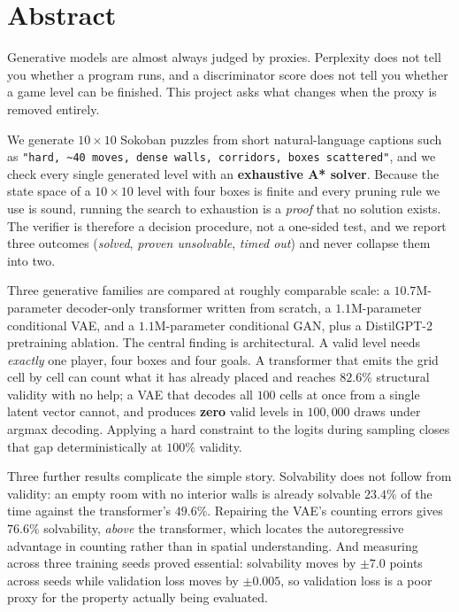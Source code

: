 \documentclass[11pt,a4paper]{report}
\begin{document}
\setcounter{page}{2}

\chapter*{Abstract}

Generative models are almost always judged by proxies. Perplexity does not tell
you whether a program runs, and a discriminator score does not tell you whether
a game level can be finished. This project asks what changes when the proxy is
removed entirely.

We generate $10\times10$ Sokoban puzzles from short natural-language captions
such as \texttt{"hard, \textasciitilde 40 moves, dense walls, corridors, boxes
scattered"}, and we check every single generated level with an
\textbf{exhaustive A* solver}. Because the state space of a $10\times10$ level
with four boxes is finite and every pruning rule we use is sound, running the
search to exhaustion is a \emph{proof} that no solution exists. The verifier is
therefore a decision procedure, not a one-sided test, and we report three
outcomes (\emph{solved}, \emph{proven unsolvable}, \emph{timed out}) and
never collapse them into two.

Three generative families are compared at roughly comparable scale: a
$10.7$M-parameter decoder-only transformer written from scratch, a
$1.1$M-parameter conditional VAE, and a $1.1$M-parameter conditional GAN, plus
a DistilGPT-2 pretraining ablation. The central finding is architectural. A
valid level needs \emph{exactly} one player, four boxes and four goals. A
transformer that emits the grid cell by cell can count what it has already
placed and reaches $82.6\%$ structural validity with no help; a VAE that
decodes all $100$ cells at once from a single latent vector cannot, and produces
\textbf{zero} valid levels in $100{,}000$ draws under argmax decoding. Applying
a hard constraint to the logits during sampling closes that gap deterministically
at $100\%$ validity.

Three further results complicate the simple story. Solvability does not follow
from validity: an empty room with no interior walls is already solvable
$23.4\%$ of the time against the transformer's $49.6\%$. Repairing the VAE's
counting errors gives $76.6\%$ solvability, \emph{above} the transformer,
which locates the autoregressive advantage in counting rather than in spatial
understanding. And measuring across three training seeds proved essential:
solvability moves by $\pm 7.0$ points across seeds while validation loss moves
by $\pm 0.005$, so validation loss is a poor proxy for the property actually
being evaluated.
\end{document}
